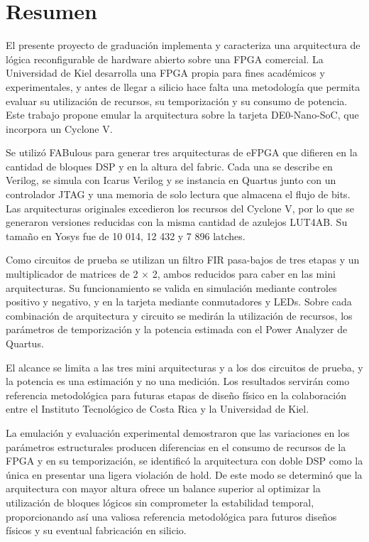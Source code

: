 \chapter*{Resumen}
\thispagestyle{empty}

El presente proyecto de graduación implementa y caracteriza una arquitectura de lógica reconfigurable de hardware abierto sobre una FPGA comercial. La Universidad de Kiel desarrolla una FPGA propia para fines académicos y experimentales, y antes de llegar a silicio hace falta una metodología que permita evaluar su utilización de recursos, su temporización y su consumo de potencia. Este trabajo propone emular la arquitectura sobre la tarjeta DE0-Nano-SoC, que incorpora un Cyclone V.

Se utilizó FABulous para generar tres arquitecturas de eFPGA que difieren en la cantidad de bloques DSP y en la altura del fabric. Cada una se describe en Verilog, se simula con Icarus Verilog y se instancia en Quartus junto con un controlador JTAG y una memoria de solo lectura que almacena el flujo de bits. Las arquitecturas originales excedieron los recursos del Cyclone V, por lo que se generaron versiones reducidas con la misma cantidad de azulejos LUT4AB. Su tamaño en Yosys fue de 10 014, 12 432 y 7 896 latches.

Como circuitos de prueba se utilizan un filtro FIR pasa-bajos de tres etapas y un multiplicador de matrices de 2 × 2, ambos reducidos para caber en las mini arquitecturas. Su funcionamiento se valida en simulación mediante controles positivo y negativo, y en la tarjeta mediante conmutadores y LEDs. Sobre cada combinación de arquitectura y circuito se medirán la utilización de recursos, los parámetros de temporización y la potencia estimada con el Power Analyzer de Quartus.

El alcance se limita a las tres mini arquitecturas y a los dos circuitos de prueba, y la potencia es una estimación y no una medición. Los resultados servirán como referencia metodológica para futuras etapas de diseño físico en la colaboración entre el Instituto Tecnológico de Costa Rica y la Universidad de Kiel.

La emulación y evaluación experimental demostraron que las variaciones en los parámetros estructurales producen diferencias en el consumo de recursos de la FPGA y en su temporización, se identificó la arquitectura con doble DSP como la única en presentar una ligera violación de hold. De este modo se determinó que la arquitectura con mayor altura ofrece un balance superior al optimizar la utilización de bloques lógicos sin comprometer la estabilidad temporal, proporcionando así una valiosa referencia metodológica para futuros diseños físicos y su eventual fabricación en silicio.

